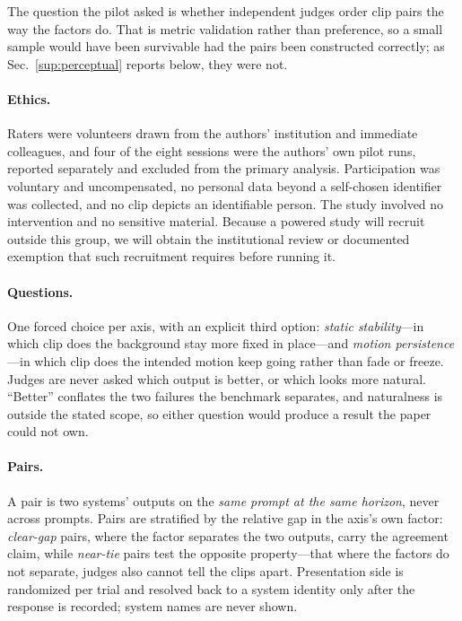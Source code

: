 \documentclass[10pt,twocolumn,letterpaper]{article}
\begin{document}
The question the pilot asked is whether independent judges order clip pairs the
way the factors do. That is metric validation rather than preference, so a small
sample would have been survivable had the pairs been constructed correctly; as
Sec.~\ref{sup:perceptual} reports below, they were not.

\paragraph{Ethics.}
Raters were volunteers drawn from the authors' institution and immediate
colleagues, and four of the eight sessions were the authors' own pilot runs,
reported separately and excluded from the primary analysis. Participation was
voluntary and uncompensated, no personal data beyond a self-chosen identifier
was collected, and no clip depicts an identifiable person. The study involved
no intervention and no sensitive material. Because a powered study will recruit
outside this group, we will obtain the institutional review or documented
exemption that such recruitment requires before running it.

\paragraph{Questions.}
One forced choice per axis, with an explicit third option:
\emph{static stability}---in which clip does the background stay more fixed in
place---and \emph{motion persistence}---in which clip does the intended motion
keep going rather than fade or freeze. Judges are never asked which output is
better, or which looks more natural. ``Better'' conflates the two failures the
benchmark separates, and naturalness is outside the stated scope, so either
question would produce a result the paper could not own.

\paragraph{Pairs.}
A pair is two systems' outputs on the \emph{same prompt at the same horizon},
never across prompts. Pairs are stratified by the relative gap in the axis's own
factor: \emph{clear-gap} pairs, where the factor separates the two outputs, carry
the agreement claim, while \emph{near-tie} pairs test the opposite property---that
where the factors do not separate, judges also cannot tell the clips apart.
Presentation side is randomized per trial and resolved back to a system
identity only after the response is recorded; system names are never shown.
\end{document}
